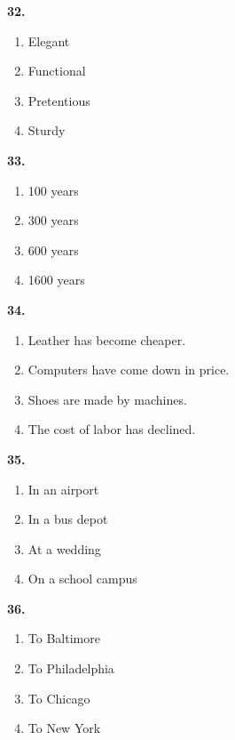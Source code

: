 \documentclass[12pt]{article}
\begin{document}
\par
\vspace{0.25\baselineskip}
\noindent\textbf{32.}
\begin{enumerate}[label=(\Alph*),leftmargin=*,itemsep=0.2em]
\item Elegant
\item Functional
\item Pretentious
\item Sturdy
\end{enumerate}
\par
\vspace{0.25\baselineskip}
\noindent\textbf{33.}
\begin{enumerate}[label=(\Alph*),leftmargin=*,itemsep=0.2em]
\item 100 years
\item 300 years
\item 600 years
\item 1600 years
\end{enumerate}
\par
\vspace{0.25\baselineskip}
\noindent\textbf{34.}
\begin{enumerate}[label=(\Alph*),leftmargin=*,itemsep=0.2em]
\item Leather has become cheaper.
\item Computers have come down in price.
\item Shoes are made by machines.
\item The cost of labor has declined.
\end{enumerate}
\par
\vspace{0.25\baselineskip}
\noindent\textbf{35.}
\begin{enumerate}[label=(\Alph*),leftmargin=*,itemsep=0.2em]
\item In an airport
\item In a bus depot
\item At a wedding
\item On a school campus
\end{enumerate}
\par
\vspace{0.25\baselineskip}
\noindent\textbf{36.}
\begin{enumerate}[label=(\Alph*),leftmargin=*,itemsep=0.2em]
\item To Baltimore
\item To Philadelphia
\item To Chicago
\item To New York
\end{enumerate}
\end{document}
